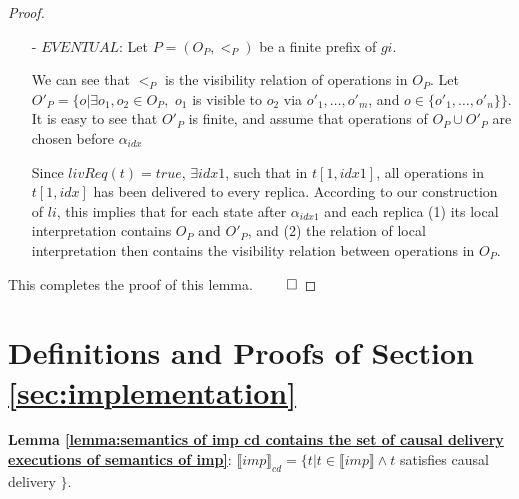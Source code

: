 \begin {proof}
\begin{itemize}
\item[-] $\textit{EVENTUAL}$: Let $P=(O_P,<_P)$ be a finite prefix of $gi$.

We can see that $<_P$ is the visibility relation of operations in $O_P$. Let $O'_P = \{ o \vert \exists o_1,o_2 \in O_P,$ $o_1$ is visible to $o_2$ via $o'_1,\ldots,o'_m$, and $o \in \{ o'_1,\ldots,o'_n \} \}$. It is easy to see that $O'_P$ is finite, and assume that operations of $O_P \cup O'_P$ are chosen before $\alpha_{idx}$

Since $livReq(t)=true$, $\exists idx1$, such that in $t[1,idx1]$, all operations in $t[1,idx]$ has been delivered to every replica. According to our construction of $li$, this implies that for each state after $\alpha_{idx1}$ and each replica (1) its local interpretation contains $O_P$ and $O'_P$, and (2) the relation of local interpretation then contains the visibility relation between operations in $O_P$.
\end{itemize}

This completes the proof of this lemma. $\qed$
\end {proof}








\section{Definitions and Proofs of Section \ref{sec:implementation}}
\label{sec:appendix definitions and proofs of section implementation}



{\noindent \bf Lemma \ref{lemma:semantics of imp cd contains the set of causal delivery executions of semantics of imp}}: $\llbracket imp \rrbracket_{cd} = \{ t \vert t \in \llbracket imp \rrbracket \wedge t$ satisfies causal delivery $\}$.

